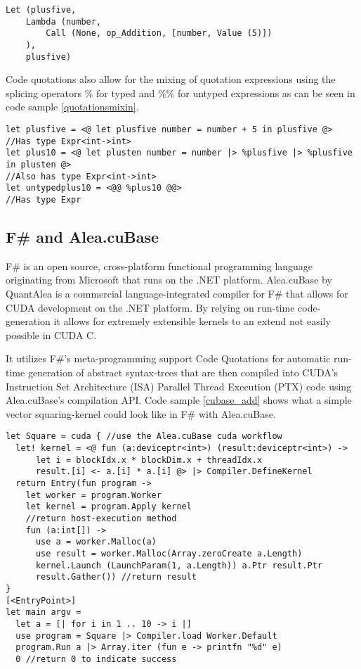{\begin{lstlisting}[caption=Abstract syntax tree for the example quotation expression, label=quotationast]
Let (plusfive, 
	Lambda (number, 
		Call (None, op_Addition, [number, Value (5)])
	), 
	plusfive)
\end{lstlisting}

Code quotations also allow for the mixing of quotation expressions using the splicing operators $\%$ for typed and $\%\%$ for untyped expressions as can be seen in code sample \ref{quotationsmixin}.

\begin{lstlisting}[caption=Quotation mixing, label=quotationsmixin]
let plusfive = <@ let plusfive number = number + 5 in plusfive @>
//Has type Expr<int->int>
let plus10 = <@ let plusten number = number |> %plusfive |> %plusfive in plusten @>
//Also has type Expr<int->int>
let untypedplus10 = <@@ %plus10 @@>
//Has type Expr
\end{lstlisting}


\subsection{F\# and Alea.cuBase}
F\#\cite{fsharp} is an open source, cross-platform functional programming language originating from Microsoft that runs on the .NET platform.
Alea.cuBase by QuantAlea\cite{quantalea} is a commercial language-integrated compiler for F\# that allows for CUDA development on the .NET platform.
By relying on run-time code-generation it allows for extremely extensible kernels to an extend not easily possible in CUDA C.

It utilizes F\#'s meta-programming support Code Quotations for automatic run-time generation of abstract syntax-trees that are then compiled into CUDA's Instruction Set Architecture (ISA) Parallel Thread Execution (PTX) code using Alea.cuBase's compilation API.
Code sample \ref{cubase_add} shows what a simple vector squaring-kernel could look like in F\# with Alea.cuBase.

\begin{lstlisting}[caption=Alea.cuBase square kernel, label=cubase_add]
let Square = cuda { //use the Alea.cuBase cuda workflow
  let! kernel = <@ fun (a:deviceptr<int>) (result:deviceptr<int>) ->
      let i = blockIdx.x * blockDim.x + threadIdx.x
      result.[i] <- a.[i] * a.[i] @> |> Compiler.DefineKernel
  return Entry(fun program ->
    let worker = program.Worker
    let kernel = program.Apply kernel
    //return host-execution method
    fun (a:int[]) ->
      use a = worker.Malloc(a)
      use result = worker.Malloc(Array.zeroCreate a.Length)
      kernel.Launch (LaunchParam(1, a.Length)) a.Ptr result.Ptr
      result.Gather()) //return result
}
[<EntryPoint>]
let main argv = 
  let a = [| for i in 1 .. 10 -> i |]
  use program = Square |> Compiler.load Worker.Default
  program.Run a |> Array.iter (fun e -> printfn "%d" e)
  0 //return 0 to indicate success
\end{lstlisting}

}
